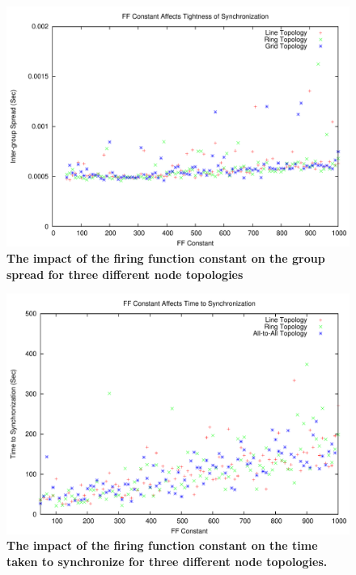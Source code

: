 \begin{figure}[t]
\begin{center}
\includegraphics[width=1.0\hsize]{./figures/16-NOADD-LINERINGGRIDALLALL-SPREAD.pdf}
\end{center}
\caption{{\small {\bf The impact of the firing function constant on the group spread for three different node topologies}}}
\label{fig:lgp}
\end{figure}

\begin{figure}[t]
\begin{center}
\includegraphics[width=1.0\hsize]{./figures/16-NOADD-LINERINGALLTOALL.pdf}
\end{center}
\caption{{\small {\bf The impact of the firing function constant on the time taken to synchronize for three different node topologies.}}}
\label{fig:lgp}
\end{figure}


